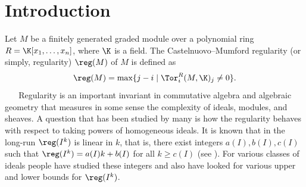 \section{Introduction}
Let $M$ be a finitely generated graded module over a polynomial ring $R = \K[x_1,\ldots,x_n]$, where
$\K$ is a field. The Castelnuovo--Mumford regularity (or simply, regularity) $\reg(M)$ of $M$
is defined as
$$
 \reg(M)=\max \{j-i \mid \Tor_i^R(M, \K)_j \neq 0\}.
$$
 $\text{  }$ $\text{  }$Regularity  is an important invariant in commutative algebra and algebraic geometry that measures in some sense the complexity of ideals, modules, and sheaves. A question that has been studied by many is how the regularity behaves with respect to taking powers of homogeneous ideals. It is known that in the long-run $\reg(I^k)$ is linear in $k$, that is, there exist integers $a(I), b(I), c(I)$ such that $\reg(I^k) = a(I)k + b(I)$ for all $k\geq c(I)$ (see \cite{CHT,vijay}). For various classes of ideals people have studied these integers and also have looked for various upper and lower bounds for $\reg(I^k)$.

